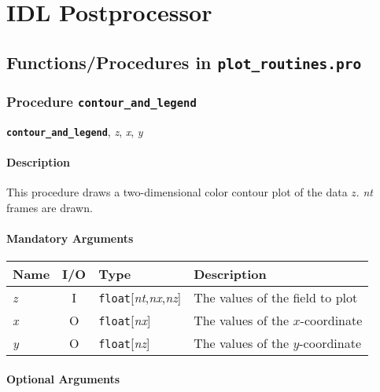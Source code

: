\newcommand{\IDLf}[1]{\texttt{\textbf{#1}}}
\newcommand{\IDLa}[1]{\textit{#1}}
\newcommand{\IDLbool}{\texttt{bool}}
\newcommand{\IDLint}{\texttt{int}}
\newcommand{\IDLstr}{\texttt{string}}
\newcommand{\IDLflt}{\texttt{float}}
\newcommand{\IDLopt}[1]{$\langle$ #1 $\rangle$}

\chapter{IDL Postprocessor}


\section{Functions/Procedures in \IDLf{plot\_routines.pro}}

\subsection{Procedure \IDLf{{contour\_and\_legend}}}

\IDLf{{contour\_and\_legend}}, \IDLa{z}, \IDLa{x}, \IDLa{y}

\subsubsection{Description}

This procedure draws a two-dimensional color contour plot of the data
$z$.  \IDLa{nt} frames are drawn.

\subsubsection{Mandatory Arguments}

\begin{tabular}{lcll}
Name & I/O & Type & Description\\
\hline
\IDLa{z} & I & \IDLflt[\IDLa{nt},\IDLa{nx},\IDLa{nz}] 
                                  & The values of the field to plot\\
\IDLa{x} & O & \IDLflt[\IDLa{nx}] & The values of the $x$-coordinate\\ 
\IDLa{y} & O & \IDLflt[\IDLa{nz}] & The values of the $y$-coordinate\\ 
\end{tabular}


\subsubsection{Optional Arguments}

